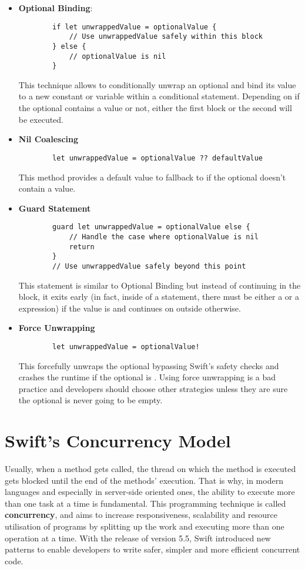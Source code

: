 \begin{itemize}
    \item \textbf{Optional Binding}:
    \begin{verbatim}
        if let unwrappedValue = optionalValue {
            // Use unwrappedValue safely within this block
        } else {
            // optionalValue is nil
        }
    \end{verbatim}
    This technique allows to conditionally unwrap an optional and bind its value to a new constant or variable within a conditional statement. Depending on if the optional contains a value or not, either the first block or the second will be executed.
    \item \textbf{Nil Coalescing}
    \begin{verbatim}
        let unwrappedValue = optionalValue ?? defaultValue
    \end{verbatim}
    This method provides a default value to fallback to if the optional doesn't contain a value.
    \item \textbf{Guard Statement}
    \begin{verbatim}
        guard let unwrappedValue = optionalValue else {
            // Handle the case where optionalValue is nil
            return
        }
        // Use unwrappedValue safely beyond this point
    \end{verbatim}
    This statement is similar to Optional Binding but instead of continuing in the  block, it exits early (in fact, inside of a  statement, there must be either a  or a  expression) if the value is  and continues on outside otherwise.
    \item \textbf{Force Unwrapping}
    \begin{verbatim}
        let unwrappedValue = optionalValue!
    \end{verbatim}
    This forcefully unwraps the optional bypassing Swift's safety checks and crashes the runtime if the optional is . Using force unwrapping is a bad practice and developers should choose other strategies unless they are sure the optional is never going to be empty.
\end{itemize}

\section{Swift's Concurrency Model}
Usually, when a method gets called, the thread on which the method is executed gets blocked until the end of the methods' execution. That is why, in modern languages and especially in server-side oriented ones, the ability to execute more than one task at a time is fundamental. 
This programming technique is called \textbf{concurrency}, and aims to increase responsiveness, scalability and resource utilisation of programs by splitting up the work and executing more than one operation at a time. With the release of version 5.5, Swift introduced new patterns to enable developers to write safer, simpler and more efficient concurrent code.

